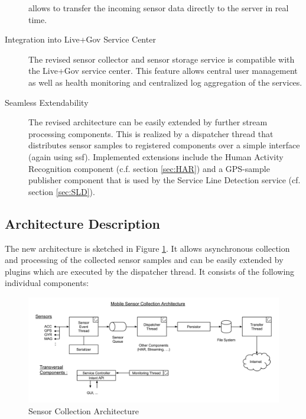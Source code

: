 \begin{description}
  allows to transfer the incoming sensor data directly to the server
  in real time. 
\item[Integration into Live+Gov Service Center] The revised sensor
  collector and sensor storage service is compatible with the Live+Gov
  service center. This feature allows central user management as well
  as health monitoring and centralized log aggregation of the services.
\item[Seamless Extendability] The revised architecture can be easily
  extended by further stream processing components. This is realized
  by a dispatcher thread that distributes sensor samples to registered
  components over a simple interface (again using ssf). Implemented
  extensions include the Human Activity Recognition component
  (c.f. section \ref{sec:HAR}) and a GPS-sample publisher component
  that is used by the Service Line Detection service (cf. section
  \ref{sec:SLD}).
\end{description}

\subsection{Architecture Description}

The new architecture is sketched in Figure
\ref{fig:sc_architecture}. It allows asynchronous collection and
processing of the collected sensor samples and can be easily extended
by plugins which are executed by the dispatcher thread. It consists of
the following individual components:

\begin{figure}[h]
\centering
\includegraphics[width=\textwidth]{img/sc/sc_architecture.png}
\caption{Sensor Collection Architecture}\label{fig:sc_architecture}
\end{figure}

